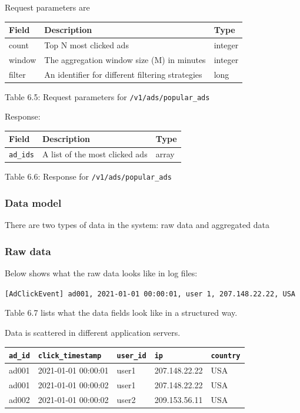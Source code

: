 \documentclass{report}
\theoremstyle{definition}
\let\oldsubsubsection\subsubsection
\renewcommand{\subsubsection}{\oldsubsubsection*}
\begin{document}
Request parameters are

\begin{tabular}{|p{4cm}|p{4cm}|p{4cm}|}
\hline
\textbf{Field} & \textbf{Description} & \textbf{Type} \\
\hline
count & Top N most clicked ads & integer \\
\hline
window & The aggregation window size (M) in minutes & integer \\
\hline
filter & An identifier for different filtering strategies & long \\
\hline
\end{tabular}

Table 6.5: Request parameters for \lstinline|/v1/ads/popular_ads|

Response:

\begin{tabular}{|p{4cm}|p{4cm}|p{4cm}|}
\hline
\textbf{Field} & \textbf{Description} & \textbf{Type} \\
\hline
\lstinline|ad_ids| & A list of the most clicked ads & array \\
\hline
\end{tabular}

Table 6.6: Response for \lstinline|/v1/ads/popular_ads|

\subsubsection{Data model}

There are two types of data in the system: raw data and aggregated data

\subsubsection{Raw data}

Below shows what the raw data looks like in log files:

\lstinline|[AdClickEvent] ad001, 2021-01-01 00:00:01, user 1, 207.148.22.22, USA|

Table 6.7 lists what the data fields look like in a structured way.

Data is scattered in different application servers.

\begin{tabular}{|p{3cm}|p{3cm}|p{3cm}|p{3cm}|p{2cm}|}
\hline
\lstinline|ad_id| & \lstinline|click_timestamp| & \lstinline|user_id| & \lstinline|ip| & \lstinline|country| \\
\hline
ad001 & 2021-01-01 00:00:01 & user1 & 207.148.22.22 & USA \\
\hline
ad001 & 2021-01-01 00:00:02 & user1 & 207.148.22.22 & USA \\
\hline
ad002 & 2021-01-01 00:00:02 & user2 & 209.153.56.11 & USA \\
\hline
\end{tabular}
\end{document}

